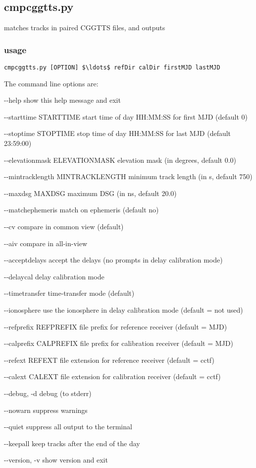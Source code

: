 \subsection{cmpcggtts.py}

 matches tracks in paired CGGTTS files, and outputs 

\subsubsection{usage}

\begin{lstlisting}[mathescape=true]
cmpcggtts.py [OPTION] $\ldots$ refDir calDir firstMJD lastMJD
\end{lstlisting}
The command line options are:
\begin{description*}
 \item[-{}-help]            show this help message and exit
 \item[-{}-starttime STARTTIME] start time of day HH:MM:SS for first MJD (default 0)
 \item[-{}-stoptime STOPTIME]   stop time of day HH:MM:SS for last MJD (default 23:59:00)
 \item[-{}-elevationmask ELEVATIONMASK] elevation mask (in degrees, default 0.0)
 \item[-{}-mintracklength MINTRACKLENGTH] minimum track length (in s, default 750)
 \item[-{}-maxdsg MAXDSG]       maximum DSG (in ns, default 20.0)
 \item[-{}-matchephemeris ]     match on ephemeris (default no)
  \item[-{}-cv]                  compare in common view (default)
  \item[-{}-aiv]                 compare in all-in-view
  \item[-{}-acceptdelays]        accept the delays (no prompts in delay calibration mode)
  \item[-{}-delaycal]            delay calibration mode
  \item[-{}-timetransfer]        time-transfer mode (default)
  \item[-{}-ionosphere]          use the ionosphere in delay calibration mode (default = not used)
  \item[-{}-refprefix REFPREFIX] file prefix for reference receiver (default = MJD)
  \item[-{}-calprefix CALPREFIX] file prefix for calibration receiver (default = MJD)
  \item[-{}-refext REFEXT]       file extension for reference receiver (default = cctf)
  \item[-{}-calext CALEXT]       file extension for calibration receiver (default = cctf)
  \item[-{}-debug, -d]           debug (to stderr)
  \item[-{}-nowarn]              suppress warnings
  \item[-{}-quiet]               suppress all output to the terminal
  \item[-{}-keepall]             keep tracks after the end of the day
  \item[-{}-version, -v]         show version and exit
\end{description*}
